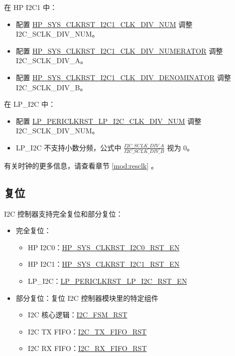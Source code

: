 \documentclass[main\_\_CN.tex]{subfiles}
\begin{document}
在 HP I2C1 中：

\begin{itemize}
    \item 配置 \hyperref[fielddesc:HPSYSCLKRSTI2C1CLKDIVNUM]{HP\_SYS\_CLKRST\_I2C1\_CLK\_DIV\_NUM} 调整 I2C\_SCLK\_DIV\_NUM。
    \item 配置 \hyperref[fielddesc:HPSYSCLKRSTI2C1CLKDIVNUMERATOR]{HP\_SYS\_CLKRST\_I2C1\_CLK\_DIV\_NUMERATOR} 调整 I2C\_SCLK\_DIV\_A。
    \item 配置 \hyperref[fielddesc:HPSYSCLKRSTI2C1CLKDIVDENOMINATOR]{HP\_SYS\_CLKRST\_I2C1\_CLK\_DIV\_DENOMINATOR} 调整 I2C\_SCLK\_DIV\_B。
\end{itemize}

在 LP\_I2C 中：
\begin{itemize}
    \item 配置 \hyperref[fielddesc:LPPERICLKRSTLPI2CCLKDIVNUM]{LP\_PERICLKRST\_LP\_I2C\_CLK\_DIV\_NUM} 调整 I2C\_SCLK\_DIV\_NUM。
    \item LP\_I2C 不支持小数分频，公式中 $\frac{I2C\_SCLK\_DIV\_A}{I2C\_SCLK\_DIV\_B}$ 视为 0。
\end{itemize}

有关时钟的更多信息，请查看章节 \ref{mod:resclk} \textit{}。


\subsection{复位}

I2C 控制器支持完全复位和部分复位：

\begin{itemize}
    \item 完全复位：
    \begin{itemize}
        \item HP I2C0：\hyperref[fielddesc:HPSYSCLKRSTI2C0RSTEN]{HP\_SYS\_CLKRST\_I2C0\_RST\_EN}
        \item HP I2C1：\hyperref[fielddesc:HPSYSCLKRSTI2C1RSTEN]{HP\_SYS\_CLKRST\_I2C1\_RST\_EN}
        \item LP\_I2C：\hyperref[fielddesc:LPPERICLKRSTLPI2CRSTEN]{LP\_PERICLKRST\_LP\_I2C\_RST\_EN}
    \end{itemize}
    \item 部分复位：复位 I2C 控制器模块里的特定组件
    \begin{itemize}
        \item I2C 核心逻辑：\hyperref[fielddesc:I2CFSMRST]{I2C\_FSM\_RST}
        \item I2C TX FIFO：\hyperref[fielddesc:I2CTXFIFORST]{I2C\_TX\_FIFO\_RST}
        \item I2C RX FIFO：\hyperref[fielddesc:I2CRXFIFORST]{I2C\_RX\_FIFO\_RST}
    \end{itemize}
\end{itemize}
\end{document}
